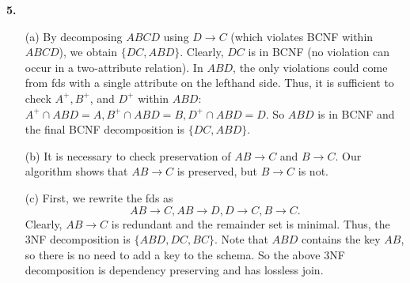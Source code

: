\vspace{4mm}
\noindent
{\bf 5.}
\begin{itemize}
\item [(a)] By decomposing $ABCD$ using $D \rightarrow C$ (which violates BCNF
within $ABCD$), we obtain $\{DC, ABD\}$. Clearly, $DC$ is in BCNF
(no violation can occur in a two-attribute relation). In $ABD$, the only
violations could come from fds with a single attribute on the lefthand side.
Thus, it is sufficient to check $A^+,B^+$, and $D^+$ within $ABD$: $A^+
\cap ABD = A, B^+ \cap ABD = B, D^+\cap ABD = D$. So $ABD$ is in BCNF
and the final BCNF decomposition is $\{DC, ABD\}$.
\item [(b)] It is necessary to check preservation of $AB \rightarrow C$ and $B \rightarrow C$.
Our algorithm shows that $AB \rightarrow C$ is preserved, but $B \rightarrow C$ is not.
\item [(c)] First, we rewrite the fds as
$$AB \rightarrow C, AB \rightarrow D, D \rightarrow C, B \rightarrow C.$$
Clearly, $AB \rightarrow C$ is redundant and the remainder set is minimal.
Thus, the 3NF decomposition is $\{ABD, DC, BC\}$. Note that
$ABD$ contains the key $AB$, so there is no need to add a key to the schema.
So the above 3NF decomposition is dependency preserving and has lossless join.
\end{itemize}



